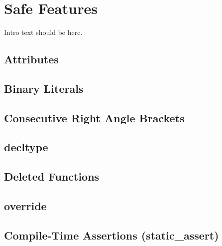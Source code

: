 
\chapter[Safe Features]{Safe Features}\label{ch-safe}

Intro text should be here. 

\renewcommand{\cppxx}{C++11}


\newpage
\section[Attributes]{Attributes}\label{attributes}



\newpage
\section[Binary Literals]{Binary Literals}\label{binary-literals}


\newpage
\section[Consecutive Right Angle Brackets]{Consecutive Right Angle Brackets}\label{consecutive-right-angle-brackets}


\newpage
\section[\tt{decltype}]{{\SecCode decltype}}\label{decltype}


\newpage
\section[Deleted Functions]{Deleted Functions}\label{deleted-functions}


\newpage
\section[\tt{override}]{{\SecCode override}}\label{override}


\newpage
\section[Compile-Time Assertions ({\tt{static\_assert}})]{Compile-Time Assertions ({\SecCode static\_assert})}\label{compile-time-assertions-(static_assert)}


